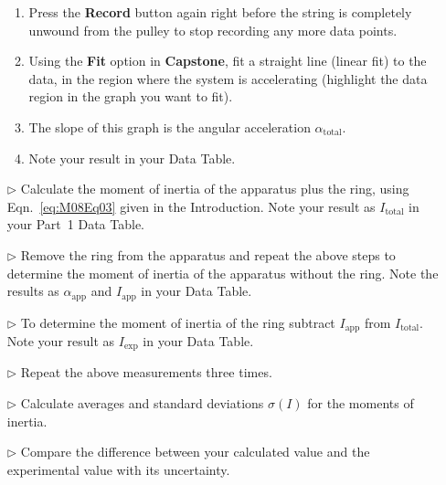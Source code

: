 \begin{itemize}
\begin{enumerate}
  \item Press the \textbf{Record} button again right before the string is completely unwound from the pulley to stop recording any more data points.
  \item Using the \textbf{Fit} option in \textbf{Capstone}, fit a straight line (linear fit) to the data, in the region where the system is accelerating (highlight the data region in the graph you want to fit).
  \item The slope of this graph is the angular acceleration $\alpha_{\mbox{total}}$.
  \item Note your result in your Data Table.
  \end{enumerate}
\item[$\triangleright$] Calculate the moment of inertia of the apparatus plus the ring, using Eqn.~\ref{eq:M08Eq03} given in the Introduction. Note your result as $I_{\mbox{total}}$ in your Part~1 Data Table.
\item[$\triangleright$] Remove the ring from the apparatus and repeat the above steps to determine the moment of inertia of the apparatus without the ring. Note the results as $\alpha_{\mbox{app}}$ and $I_{\mbox{app}}$ in your Data Table.
\item[$\triangleright$] To determine the moment of inertia of the ring subtract $I_{\mbox{app}}$ from $I_{\mbox{total}}$. Note your result as $I_{\mbox{exp}}$ in your Data Table.
\item[$\triangleright$] Repeat the above measurements three times.
\item[$\triangleright$] Calculate averages and standard deviations $\sigma(I)$ for the moments of inertia.%
\item[$\triangleright$] Compare the difference between your calculated value and the experimental value with its uncertainty.
\end{itemize}

